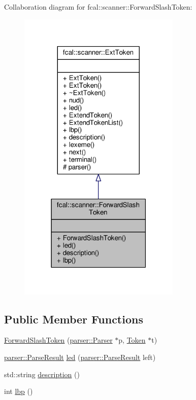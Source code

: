 Collaboration diagram for fcal\+:\+:scanner\+:\+:Forward\+Slash\+Token\+:
\nopagebreak
\begin{figure}[H]
\begin{center}
\leavevmode
\includegraphics[width=219pt]{classfcal_1_1scanner_1_1ForwardSlashToken__coll__graph}
\end{center}
\end{figure}
\subsection*{Public Member Functions}
\begin{DoxyCompactItemize}
\item 
\hyperlink{classfcal_1_1scanner_1_1ForwardSlashToken_a78339cc748c46b86c73945ea345e6e1d}{Forward\+Slash\+Token} (\hyperlink{classfcal_1_1parser_1_1Parser}{parser\+::\+Parser} $\ast$p, \hyperlink{classfcal_1_1scanner_1_1Token}{Token} $\ast$t)
\item 
\hyperlink{classfcal_1_1parser_1_1ParseResult}{parser\+::\+Parse\+Result} \hyperlink{classfcal_1_1scanner_1_1ForwardSlashToken_a75ba06718e3faa1d53c62182d0f7b1db}{led} (\hyperlink{classfcal_1_1parser_1_1ParseResult}{parser\+::\+Parse\+Result} left)
\item 
std\+::string \hyperlink{classfcal_1_1scanner_1_1ForwardSlashToken_a04d39d9ea4cbb704862d33cb447de83b}{description} ()
\item 
int \hyperlink{classfcal_1_1scanner_1_1ForwardSlashToken_ae2c4a56a7c81f1f9d697ccca1e95c153}{lbp} ()
\end{DoxyCompactItemize}
